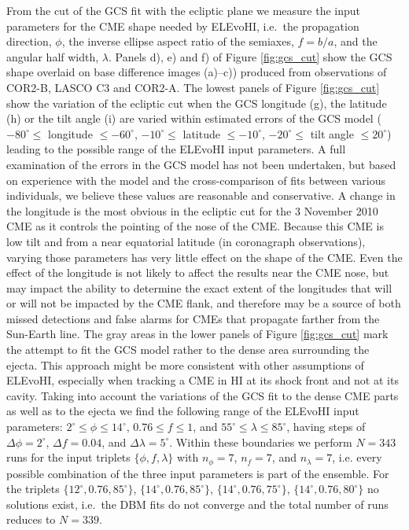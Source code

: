 \documentclass[draft]{agujournal}
\begin{document}
From the cut of the GCS fit with the ecliptic plane we measure the input parameters for the CME shape needed by ELEvoHI, i.e.\ the propagation direction, $\phi$, the inverse ellipse aspect ratio of the semiaxes, $f=b/a$, and the angular half width, $\lambda$. 
Panels d), e) and f) of Figure \ref{fig:gcs_cut} show the GCS shape overlaid on base difference images (a)--c)) produced from observations of COR2-B, LASCO C3 and COR2-A. The lowest panels of Figure \ref{fig:gcs_cut} show the variation of the ecliptic cut when the GCS longitude (g), the latitude (h) or the tilt angle (i) are varied within estimated errors of the GCS model ($-80^\circ \leq$ longitude $\leq -60^\circ$, $-10^\circ \leq$ latitude $\leq -10^\circ$, $-20^\circ \leq$ tilt angle $\leq 20^\circ$) leading to the possible range of the ELEvoHI input parameters. A full examination of the errors in the GCS model has not been undertaken, but based on experience with the model and the cross-comparison of fits between various individuals, we believe these values are reasonable and conservative. A change in the longitude is the most obvious in the ecliptic cut for the 3 November 2010 CME as it controls the pointing of the nose of the CME. Because this CME is low tilt and from a near equatorial latitude (in coronagraph observations), varying those parameters has very little effect on the shape of the CME. Even the effect of the longitude is not likely to affect the results near the CME nose, but may impact the ability to determine the exact extent of the longitudes that will or will not be impacted by the CME flank, and therefore may be a source of both missed detections and false alarms for CMEs that propagate farther from the Sun-Earth line. The gray areas in the lower panels of Figure \ref{fig:gcs_cut} mark the attempt to fit the GCS model rather to the dense area surrounding the ejecta. This approach might be more consistent with other assumptions of ELEvoHI, especially when tracking a CME in HI at its shock front and not at its cavity. Taking into account the variations of the GCS fit to the dense CME parts as well as to the ejecta we find the following range of the ELEvoHI input parameters: $2^\circ \leq \phi \leq 14^\circ$, $0.76 \leq f \leq 1$, and $55^\circ \leq \lambda \leq 85^\circ$, having steps of $\Delta \phi=2^\circ$, $\Delta f = 0.04$, and $\Delta \lambda = 5^\circ$. Within these boundaries we perform $N=343$ runs for the input triplets $\{\phi, f, \lambda \}$ with $n_\phi=7$, $n_f=7$, and $n_\lambda=7$, i.e. every possible combination of the three input parameters is part of the ensemble. For the triplets $\{12^\circ, 0.76, 85^\circ\}$, $\{14^\circ, 0.76, 85^\circ\}$, $\{14^\circ, 0.76, 75^\circ\}$, $\{14^\circ, 0.76, 80^\circ\}$ no solutions exist, i.e.\ the DBM fits do not converge and the total number of runs reduces to $N=339$.
\end{document}
